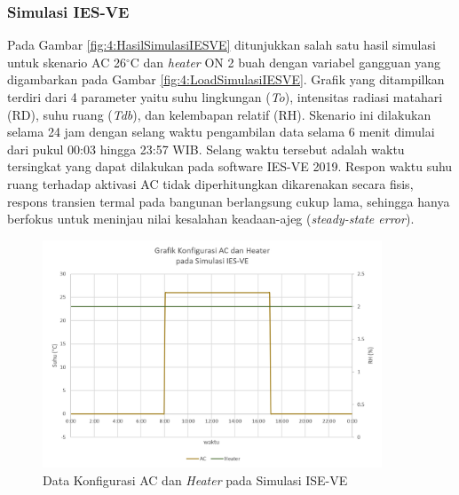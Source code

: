 \subsubsection{Simulasi IES-VE}

Pada Gambar \ref{fig:4:HasilSimulasiIESVE} ditunjukkan salah satu hasil simulasi untuk skenario AC 26$^\circ$C dan \textit{heater} ON 2 buah dengan variabel gangguan yang digambarkan pada Gambar \ref{fig:4:LoadSimulasiIESVE}. Grafik yang ditampilkan terdiri dari 4 parameter yaitu suhu lingkungan (\textit{To}), intensitas radiasi matahari (RD), suhu ruang (\textit{Tdb}), dan kelembapan relatif (RH). Skenario ini dilakukan selama 24 jam dengan selang waktu pengambilan data selama 6 menit dimulai dari pukul 00:03 hingga 23:57 WIB. Selang waktu tersebut adalah waktu tersingkat yang dapat dilakukan pada software IES-VE 2019. Respon waktu suhu ruang terhadap aktivasi AC tidak diperhitungkan dikarenakan secara fisis, respons transien termal pada bangunan berlangsung cukup lama, sehingga hanya berfokus untuk meninjau nilai kesalahan keadaan-ajeg (\textit{steady-state error}).

\begin{figure}[!h]
	\centering
	\includegraphics[width=0.9\textwidth]{figures/ACHTSimulasiIESVE}
	\caption{Data Konfigurasi AC dan \textit{Heater} pada Simulasi ISE-VE}
	\label{fig:4:ACHTSimulasiIESVE}
\end{figure}
\vspace{1em}

